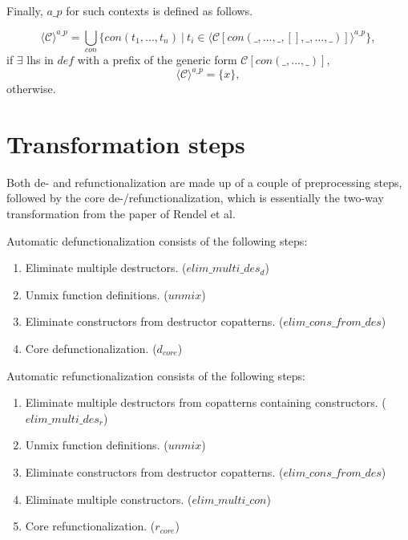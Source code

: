 Finally, $a\_p$ for such contexts is defined as follows.

\begin{equation*}
\langle \mathcal{C} \rangle^{a\_p} = \bigcup_{con} \{con(t_1, ..., t_n) ~ | ~ t_i \in \langle \mathcal{C}[con(\_, ..., \_, [], \_, ..., \_)] \rangle^{a\_p} \},
\end{equation*}
if $\exists$ lhs in $def$ with a prefix of the generic form $\mathcal{C}[con(\_, ..., \_)]$,
\begin{equation*}
\langle \mathcal{C} \rangle^{a\_p} = \{x\},
\end{equation*}
otherwise.

\section{Transformation steps}

Both de- and refunctionalization are made up of a couple of preprocessing steps, followed by the core de-/refunctionalization, which is essentially the two-way transformation from the paper of Rendel et al.

Automatic defunctionalization consists of the following steps:
\begin{enumerate}
\item Eliminate multiple destructors. ($elim\_multi\_des_d$)

\item Unmix function definitions. ($unmix$)

\item Eliminate constructors from destructor copatterns. ($elim\_cons\_from\_des$)

\item Core defunctionalization. ($d_{core}$)

\end{enumerate}

Automatic refunctionalization consists of the following steps:
\begin{enumerate}
\item Eliminate multiple destructors from copatterns containing constructors. ($elim\_multi\_des_r$)

\item Unmix function definitions. ($unmix$)

\item Eliminate constructors from destructor copatterns. ($elim\_cons\_from\_des$)

\item Eliminate multiple constructors. ($elim\_multi\_con$)

\item Core refunctionalization. ($r_{core}$)

\end{enumerate}

